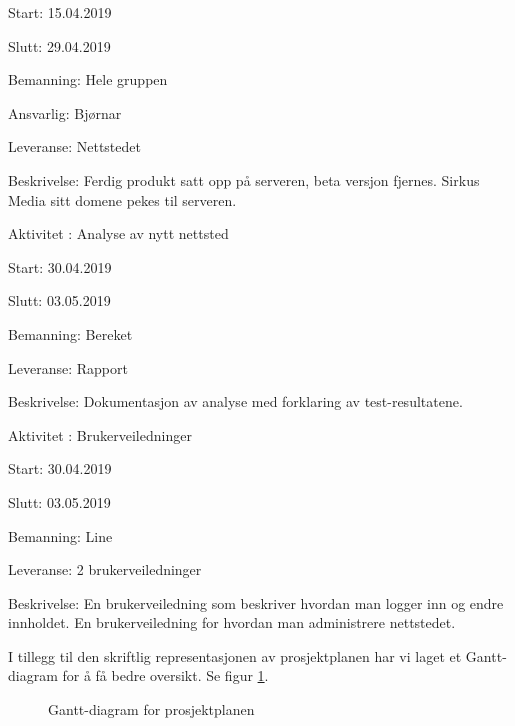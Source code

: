 \documentclass[11pt,a4paper]{report}
\begin{document}
\begin{compactdesc}
	\begin{compactitem}
	\item Start: 15.04.2019
	\item Slutt: 29.04.2019
	\item Bemanning: Hele gruppen
	\item Ansvarlig: Bjørnar
	\item Leveranse: Nettstedet
	\item Beskrivelse: Ferdig produkt satt opp på serveren, beta versjon fjernes. Sirkus Media sitt domene pekes til serveren.
	\addtocounter{aktivitetTeller}{1}
	\end{compactitem}
	\item [Aktivitet \arabic{aktivitetTeller}:] Analyse av nytt nettsted
	\begin{compactitem}
	\item Start: 30.04.2019
	\item Slutt: 03.05.2019
	\item Bemanning: Bereket
	\item Leveranse: Rapport
	\item Beskrivelse: Dokumentasjon av analyse med forklaring av test-resultatene.
	\addtocounter{aktivitetTeller}{1}
	\end{compactitem}
	\item [Aktivitet \arabic{aktivitetTeller}:] Brukerveiledninger
	\begin{compactitem}
	\item Start: 30.04.2019
	\item Slutt: 03.05.2019
	\item Bemanning: Line
	\item Leveranse: 2 brukerveiledninger
	\item Beskrivelse: En brukerveiledning som beskriver hvordan man logger inn og endre innholdet. En brukerveiledning for hvordan man administrere nettstedet.
	\addtocounter{aktivitetTeller}{1}
	\end{compactitem}
\end{compactdesc}

I tillegg til den skriftlig representasjonen av prosjektplanen har vi laget et Gantt-diagram for å få bedre oversikt. Se figur \ref{fig:gantt-diagram}.

\begin{figure}[H]
    \centering
    \caption{Gantt-diagram for prosjektplanen}
    \label{fig:gantt-diagram}
\end{figure}
\end{document}

